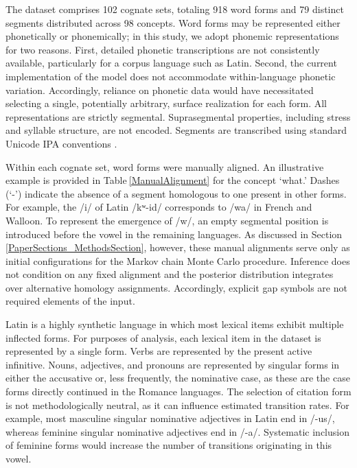 \documentclass[numsec,webpdf,modern,large,namedate]{oup-authoring-template}
\begin{document}
The dataset comprises 102 cognate sets, totaling 918 word forms and 79 distinct segments distributed across 98 concepts. Word forms may be represented either phonetically or phonemically; in this study, we adopt phonemic representations for two reasons. First, detailed phonetic transcriptions are not consistently available, particularly for a corpus language such as Latin. Second, the current implementation of the model does not accommodate within-language phonetic variation. Accordingly, reliance on phonetic data would have necessitated selecting a single, potentially arbitrary, surface realization for each form. All representations are strictly segmental. Suprasegmental properties, including stress and syllable structure, are not encoded. Segments are transcribed using standard Unicode IPA conventions \citep{IPA1999}. 

Within each cognate set, word forms were manually aligned. An illustrative example is provided in Table$~$\ref{ManualAlignment} for the concept ‘what.’ Dashes (‘-’) indicate the absence of a segment homologous to one present in other forms. For example, the /i/ of Latin /kʷ-id/ corresponds to /wa/ in French and Walloon. To represent the emergence of /w/, an empty segmental position is introduced before the vowel in the remaining languages. As discussed in Section$~$\ref{PaperSections_MethodsSection}, however, these manual alignments serve only as initial configurations for the Markov chain Monte Carlo procedure. Inference does not condition on any fixed alignment and the posterior distribution integrates over alternative homology assignments. Accordingly, explicit gap symbols are not required elements of the input. 

Latin is a highly synthetic language in which most lexical items exhibit multiple inflected forms. For purposes of analysis, each lexical item in the dataset is represented by a single form. Verbs are represented by the present active infinitive. Nouns, adjectives, and pronouns are represented by singular forms in either the accusative or, less frequently, the nominative case, as these are the case forms directly continued in the Romance languages. The selection of citation form is not methodologically neutral, as it can influence estimated transition rates. For example, most masculine singular nominative adjectives in Latin end in /-us/, whereas feminine singular nominative adjectives end in /-a/. Systematic inclusion of feminine forms would increase the number of transitions originating in this vowel. 
\end{document}
